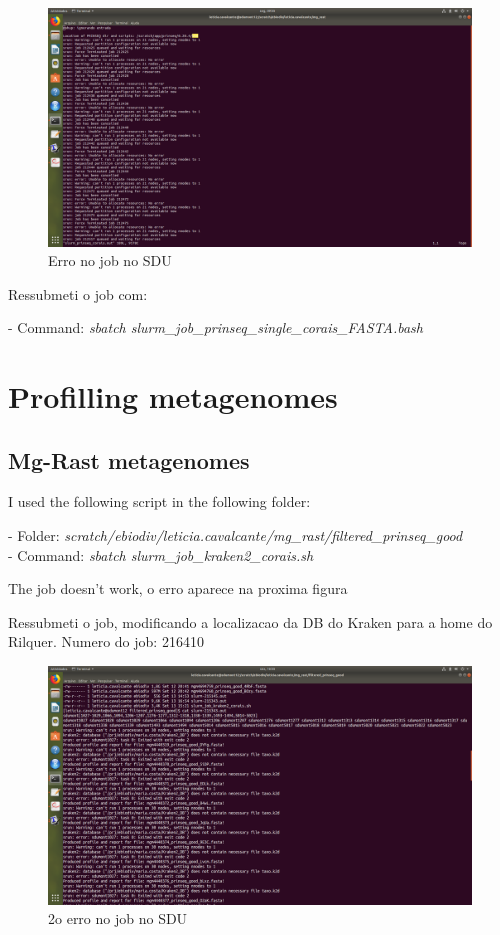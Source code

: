 \documentclass[12pt, a4paper]{report}
\begin{document}
 \begin{figure}
  \centering 
  \includegraphics[width=1.0\textwidth]{figures/Captura-2018-09-10 09-35-27.png}
  \caption{Erro no job no SDU}
  \label{texworks} 
 \end{figure}

Ressubmeti o job com:

\begin{tcolorbox}[width=6.3in]
- Command: \textit{sbatch slurm\_job\_prinseq\_single\_corais\_FASTA.bash}
\end{tcolorbox}


\chapter{Profilling metagenomes}
\section{Mg-Rast metagenomes}
I used the following script in the following folder:

\begin{tcolorbox}[width=6.3in]
- Folder: \textit{scratch/ebiodiv/leticia.cavalcante/mg\_rast/filtered\_prinseq\_good}\\
- Command: \textit{sbatch slurm\_job\_kraken2\_corais.sh}
\end{tcolorbox}

The job doesn't work, o erro aparece na proxima figura

Ressubmeti o job, modificando a localizacao da DB do Kraken para a home do Rilquer. Numero do job: 216410
 \begin{figure}
  \centering 
  \includegraphics[width=1.0\textwidth]{figures/Captura2.png}
  \caption{2o erro no job no SDU}
  \label{texworks} 
 \end{figure} 
\end{document}
